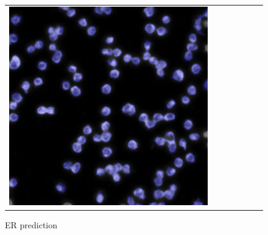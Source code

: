 \begin{figure}[H]
\begin{tabularx}{\textwidth}{YYYYYYY}
            \includegraphics{bilder/ER/segmentation/pp_7.png} 
        \end{tabularx}
    \caption{ER prediction}
    \label{fig:er-prediction}
\end{figure}